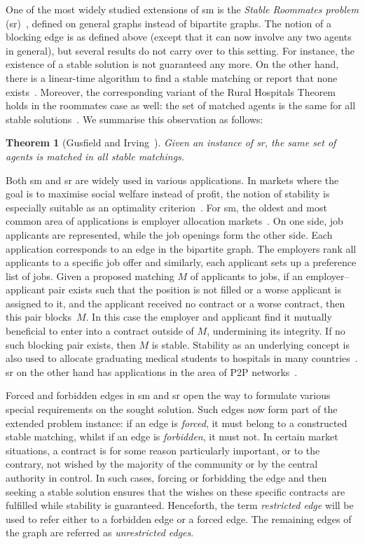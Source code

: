 \documentclass[preprint,12pt]{elsarticle}
\newtheorem{theorem}{Theorem}[section]
\begin{document}
One of the most widely studied  extensions of {\sc sm} is the \emph{Stable Roommates problem} ({\sc sr})~\cite{GS62,Irv85}, defined on general graphs instead of bipartite graphs. The notion of a blocking edge is as defined above (except that it can now involve any two agents in general), but several results do not carry over to this setting. For instance, the existence of a stable solution is not guaranteed any more. On the other hand, there is a linear-time algorithm to find a stable matching or report that none exists~\cite{Irv85}. Moreover, the corresponding variant of the Rural Hospitals Theorem holds in the roommates case as well: the set of matched agents is the same for all stable solutions~\cite{GI89}. We summarise this observation as follows:
\begin{theorem}[Gusfield and Irving~\cite{GI89}]
Given an instance of {\sc sr}, the same set of agents is matched in all stable matchings.
\label{th:rural}
\end{theorem}

Both {\sc sm} and {\sc sr} are widely used in various applications. In markets where the goal is to maximise social welfare instead of profit, the notion of stability is especially suitable as an optimality criterion~\cite{Rot84}. For {\sc sm}, the oldest and most common area of applications is employer allocation markets~\cite{RS90}.  On one side, job applicants are represented, while the job openings form the other side. Each application corresponds to an edge in the bipartite graph. The employers rank all applicants to a specific job offer and similarly, each applicant sets up a preference list of jobs. Given a proposed matching $M$ of applicants to jobs, if an employer--applicant pair exists such that the position is not filled or a worse applicant is assigned to it, and the applicant received no contract or a worse contract, then this pair blocks~$M$. In this case the employer and applicant find it mutually beneficial to enter into a contract outside of $M$, undermining its integrity. If no such blocking pair exists, then $M$ is stable. Stability as an underlying concept is also used to allocate graduating medical students to hospitals in many countries~\cite{Rot08}. {\sc sr} on the other hand has applications in the area of P2P networks~\cite{GLMMRV07}.

Forced and forbidden edges in {\sc sm} and {\sc sr} open the way to formulate various special requirements on the sought solution. Such edges now form part of the extended problem instance: if an edge is \emph{forced}, it must belong to a constructed stable matching, whilst if an edge is \emph{forbidden}, it must not.
In certain market situations, a contract is for some reason particularly important, or to the contrary, not wished by the majority of the community or by the central authority in control. In such cases, forcing or forbidding the edge and then seeking a stable solution ensures that the wishes on these specific contracts are fulfilled while stability is guaranteed. Henceforth, the term \emph{restricted edge} will be used to refer either to a forbidden edge or a forced edge. The remaining edges of the graph are referred as \emph{unrestricted edges}.
\end{document}

